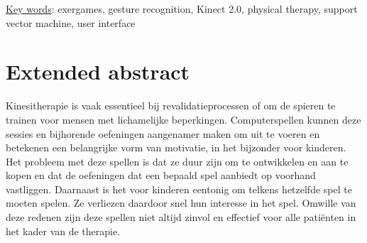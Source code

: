 




\underline{Key words}: exergames, gesture recognition, Kinect 2.0, physical therapy, support vector machine, user interface


\chapter*{Extended abstract}

Kinesitherapie is vaak essentieel bij revalidatieprocessen of om de spieren te trainen voor mensen met lichamelijke beperkingen. Computerspellen kunnen deze sessies en bijhorende oefeningen aangenamer maken om uit te voeren en betekenen een belangrijke vorm van motivatie, in het bijzonder voor kinderen. Het probleem met deze spellen is dat ze duur zijn om te ontwikkelen en aan te kopen en dat de oefeningen dat een bepaald spel aanbiedt op voorhand vastliggen. Daarnaast is het voor kinderen eentonig om telkens hetzelfde spel te moeten spelen. Ze verliezen daardoor snel hun interesse in het spel. Omwille van deze redenen zijn deze spellen niet altijd zinvol en effectief voor alle pati\"enten in het kader van de therapie.\\

